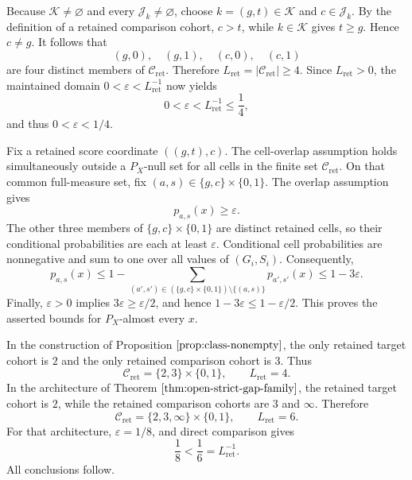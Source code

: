 Because \(\mathcal K\ne\varnothing\) and every \(\mathcal J_k\ne\varnothing\), choose \(k=(g,t)\in\mathcal K\) and \(c\in\mathcal J_k\). By the definition of a retained comparison cohort, \(c>t\), while \(k\in\mathcal K\) gives \(t\ge g\). Hence \(c\ne g\). It follows that
\[
(g,0),\quad (g,1),\quad (c,0),\quad (c,1)
\]
are four distinct members of \(\mathcal C_{\mathrm{ret}}\). Therefore \(L_{\mathrm{ret}}=|\mathcal C_{\mathrm{ret}}|\ge4\). Since \(L_{\mathrm{ret}}>0\), the maintained domain \(0<\varepsilon<L_{\mathrm{ret}}^{-1}\) now yields
\[
0<\varepsilon<L_{\mathrm{ret}}^{-1}\le\frac14,
\]
and thus \(0<\varepsilon<1/4\).

Fix a retained score coordinate \(((g,t),c)\). The cell-overlap assumption holds simultaneously outside a \(P_X\)-null set for all cells in the finite set \(\mathcal C_{\mathrm{ret}}\). On that common full-measure set, fix \((a,s)\in\{g,c\}\times\{0,1\}\). The overlap assumption gives
\[
p_{a,s}(x)\ge\varepsilon.
\]
The other three members of \(\{g,c\}\times\{0,1\}\) are distinct retained cells, so their conditional probabilities are each at least \(\varepsilon\). Conditional cell probabilities are nonnegative and sum to one over all values of \((G_i,S_i)\). Consequently,
\[
p_{a,s}(x)
\le 1-\sum_{(a',s')\in(\{g,c\}\times\{0,1\})\setminus\{(a,s)\}}p_{a',s'}(x)
\le 1-3\varepsilon.
\]
Finally, \(\varepsilon>0\) implies \(3\varepsilon\ge\varepsilon/2\), and hence \(1-3\varepsilon\le1-\varepsilon/2\). This proves the asserted bounds for \(P_X\)-almost every \(x\).

In the construction of Proposition \(\ref{prop:class-nonempty}\), the only retained target cohort is \(2\) and the only retained comparison cohort is \(3\). Thus
\[
\mathcal C_{\mathrm{ret}}=\{2,3\}\times\{0,1\},
\qquad L_{\mathrm{ret}}=4.
\]
In the architecture of Theorem \(\ref{thm:open-strict-gap-family}\), the retained target cohort is \(2\), while the retained comparison cohorts are \(3\) and \(\infty\). Therefore
\[
\mathcal C_{\mathrm{ret}}=\{2,3,\infty\}\times\{0,1\},
\qquad L_{\mathrm{ret}}=6.
\]
For that architecture, \(\varepsilon=1/8\), and direct comparison gives
\[
\frac18<\frac16=L_{\mathrm{ret}}^{-1}.
\]
All conclusions follow.